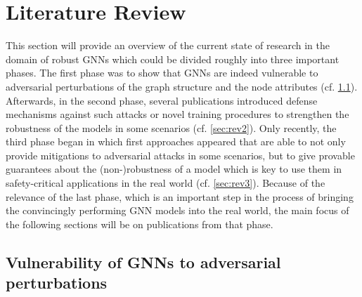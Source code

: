 \documentclass[a4paper,preprint]{sig-alternate}
\begin{document}
\vfill
\pagebreak

\section{Literature Review}
\label{sec:literature}

This section will provide an overview of the current state of research in the domain of robust GNNs which could be divided
roughly into three important phases.
The first phase was to show that GNNs are indeed vulnerable to adversarial perturbations of the graph structure and the node attributes (cf. \ref{sec:rev1}).
Afterwards, in the second phase, several publications introduced defense mechanisms against such attacks or novel training procedures 
to strengthen the robustness of the models in some scenarios (cf. \ref{sec:rev2}). Only recently, the third phase began in which first approaches appeared
that are able to not only provide mitigations to adversarial attacks in some scenarios, but to give provable guarantees about the (non-)robustness 
of a model which is key to use them in safety-critical applications in the real world (cf. \ref{sec:rev3}). Because of the relevance of the last phase, which 
is an important step in the process of bringing the convincingly performing GNN models into the real world, the main focus of the following sections
will be on publications from that phase.

\subsection{Vulnerability of GNNs to adversarial perturbations}
\label{sec:rev1}
\end{document}
